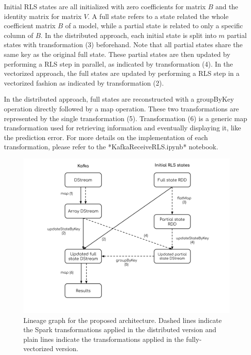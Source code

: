Initial RLS states are all initialized with zero coefficients for matrix $B$ and the identity matrix for matrix $V$.
A full state refers to a state related the whole coefficient matrix $B$ of a model,
while a partial state is related to only a specific column of $B$.
In the distributed approach, each initial state is split into $m$ partial states with transformation (3) beforehand.
Note that all partial states share the same key as the original full state.
These partial states are then updated by performing a RLS step in parallel, as indicated by transformation (4).
In the vectorized approach, the full states are updated by performing a RLS step in a vectorized fashion
as indicated by transformation (2).

In the distributed approach, full states are reconstructed with a groupByKey operation directly followed by a map operation.
These two transformations are represented by the single transformation (5).
Transformation (6) is a generic map transformation used for retrieving information and eventually displaying it,
like the prediction error. For more details on the implementation of each transformation, please refer to the
*KafkaReceiveRLS.ipynb* notebook.

\begin{figure}[H]
    \begin{center}
        \includegraphics[width=\textwidth, keepaspectratio]{imgs/lineage-graph.png}
        \caption{Lineage graph for the proposed architecture. Dashed lines indicate
            the Spark transformations applied in the distributed version
            and plain lines indicate the transformations applied in the fully-vectorized version.}
        \label{architecture}
    \end{center}
\end{figure}

